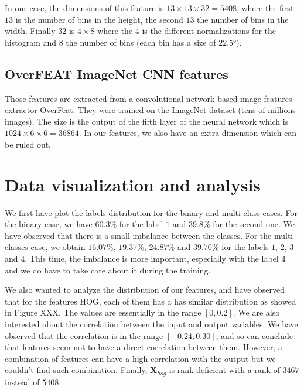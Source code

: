\documentclass{article} %
\begin{document}
In our case, the dimensions of this feature is $13 \times 13 \times 32=5408$, where the first $13$ is the number of bins in the height, the second $13$ the number of bins in the width. Finally $32$ is $4 \times 8$ where the $4$ is the different normalizations for the histogram and $8$ the number of bins (each bin has a size of $22.5°$). 

\subsection{OverFEAT ImageNet CNN features}

Those features are extracted from a convolutional network-based image features extractor OverFeat. They were trained on the ImageNet dataset (tens of millions images). The size is the output of the fifth layer of the neural network which is $1024 \times 6 \times 6 = 36864$. In our features, we also have an extra dimension which can be ruled out.

\section{Data visualization and analysis}

We first have plot the labels distribution for the binary and multi-class cases. For the binary case, we have $60.3\%$ for the label $1$ and $39.8\%$ for the second one. We have observed that there is a small imbalance between the classes. For the multi-classes case, we obtain $16.07\%$, $19.37\%$, $24.87\%$ and $39.70\%$ for the labels $1$, $2$, $3$ and $4$. This time, the imbalance is more important, especially with the label $4$ and we do have to take care about it during the training.

We also wanted to analyze the distribution of our features, and have observed that for the features HOG, each of them has a has similar distribution as showed in Figure XXX. The values are essentially in the range $[0, 0.2]$. We are also interested about the correlation between the input and output variables. We have observed that the correlation is in the range $[-0.24 ;0.30]$, and so can conclude that features seem not to have a direct correlation between them. However, a combination of features can have a high correlation with the output but we couldn't find such combination. Finally, $\mathbf{X}_{hog}$ is rank-deficient with a rank of $3467$ instead of $5408$.
\end{document}
